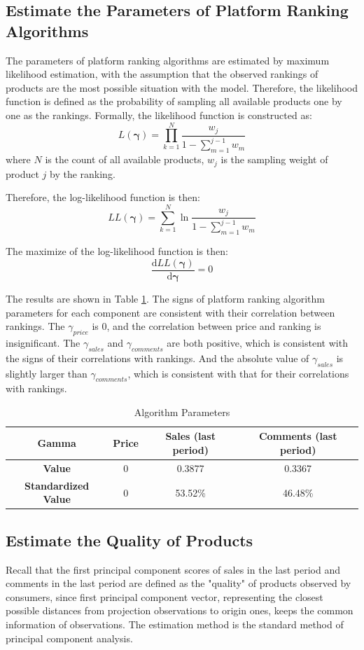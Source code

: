 \documentclass{article}
\begin{document}
\subsection{Estimate the Parameters of Platform Ranking Algorithms}
The parameters of platform ranking algorithms are estimated by maximum likelihood estimation, with the assumption that the observed rankings of products are the most possible situation with the model. Therefore, the likelihood function is defined as the probability of sampling all available products one by one as the rankings. Formally, the likelihood function is constructed as:
$$
L(\pmb \gamma) = \prod_{k=1}^{N} \frac{w_j}{1-\sum_{m=1}^{j-1}w_m}
$$
where $N$ is the count of all available products, $w_{j}$ is the sampling weight of product $j$ by the ranking. 

Therefore, the log-likelihood function is then:
$$
LL(\pmb \gamma) = \sum_{k=1}^{N} \ln\frac{w_j}{1-\sum_{m=1}^{j-1}w_m}
$$

The maximize of the log-likelihood function is then:
$$
\frac{\mathrm{d}LL(\pmb \gamma)}{\mathrm{d}\pmb \gamma} = 0
$$

The results are shown in Table \ref{gamma}. The signs of platform ranking algorithm parameters for each component are consistent with their correlation between rankings. The $\gamma_{price}$ is 0, and the correlation between price and ranking is insignificant. The $\gamma_{sales}$ and $\gamma_{comments}$ are both positive, which is consistent with the signs of their correlations with rankings. And the absolute value of $\gamma_{sales}$ is slightly larger than $\gamma_{comments}$, which is consistent with that for their correlations with rankings. 
\begin{table}[H]
\centering
\begin{tabular}{|c|c|c|c|}
\hline
\textbf{Gamma} & \textbf{Price} & \textbf{Sales (last period)} & \textbf{Comments (last period)}\\ 
\hline
 \textbf{Value} & 0 & 0.3877 & 0.3367\\  
\hline 
 \textbf{Standardized Value} & 0 & 53.52\% & 46.48\%\\  
\hline 
\end{tabular}
\caption{\label{gamma}Algorithm Parameters}
\end{table}


\subsection{Estimate the Quality of Products}
Recall that the first principal component scores of sales in the last period and comments in the last period are defined as the "quality" of products observed by consumers, since first principal component vector, representing the closest possible distances from projection observations to origin ones, keeps the common information of observations. The estimation method is the standard method of principal component analysis. 
\end{document}
